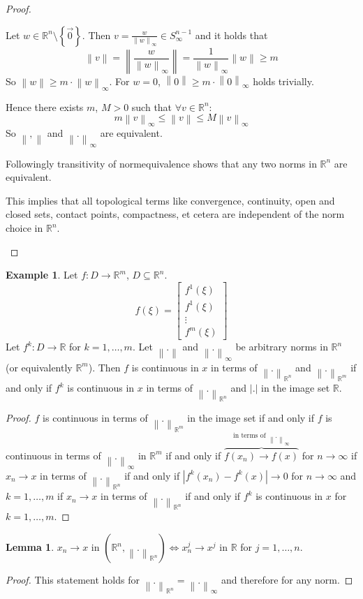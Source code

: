\documentclass[a4paper,landscape,twocolumn]{article}
\theoremstyle{definition}
\newtheorem{ex}{Example}
\newtheorem{lemma}{Lemma}
\newcommand\set[1]{\left\{#1\right\}}
\newcommand\abs[1]{\left|#1\right|}
\newcommand\norm[1]{\left\|#1\right\|}
\newcommand\inorm[1]{\left\|#1\right\|_\infty}
\begin{document}
\begin{proof}
\begin{enumerate}
  Let $w \in \mathbb R^n \setminus \set{\vec{0}}$.
  Then $v = \frac{w}{\inorm{w}} \in S_{\infty}^{n-1}$ and it holds that
  \[ \norm{v} = \norm{\frac{w}{\inorm{w}}} = \frac{1}{\inorm{w}} \norm{w} \geq m \]
  So $\norm{w} \geq m \cdot \inorm{w}$.
  For $w = 0$, $\norm{0} \geq m \cdot \inorm{0}$ holds trivially.

  Hence there exists $m$, $M > 0$ such that $\forall v \in \mathbb R^n$:
  \[ m \inorm{v} \leq \norm{v} \leq M \inorm{v} \]
  So $\norm{,}$ and $\inorm{.}$ are equivalent.

  Followingly transitivity of normequivalence shows that
  any two norms in $\mathbb R^n$ are equivalent.

  This implies that all topological terms like convergence, continuity,
  open and closed sets, contact points, compactness, et cetera are
  independent of the norm choice in $\mathbb R^n$.
\end{enumerate}
\end{proof}

\begin{ex}
  Let $f: D \to \mathbb R^m$, $D \subseteq \mathbb R^n$.
  \[
  f(\xi) = \begin{bmatrix}
    f^1(\xi) \\
    f^1(\xi) \\
    \vdots \\
    f^m(\xi)
    \end{bmatrix}
  \]
  Let $f^k: D \to \mathbb R$ for $k=1,\ldots,m$.
  Let $\norm{.}$ and $\inorm{.}$ be arbitrary norms in $\mathbb R^n$ (or equivalently $\mathbb R^m$).
  Then $f$ is continuous in $x$ in terms of $\norm{.}_{\mathbb R^n}$ and $\norm{.}_{\mathbb R^m}$
  if and only if $f^k$ is continuous in $x$ in terms of $\norm{.}_{\mathbb R^n}$ and $\abs{.}$ in the
  image set $\mathbb R$.
\end{ex}
\begin{proof}
  $f$ is continuous in terms of $\norm{.}_{\mathbb R^m}$ in the image set if and only if
  $f$ is continuous in terms of $\inorm{.}$ in $\mathbb R^m$ if and only if
  $\overbrace{f(x_n) \to f(x)}^{\text{in terms of } \inorm{.}}$ for $n\to\infty$ if $x_n \to x$ in terms of $\norm{.}_{\mathbb R^n}$ if and only if
  $\abs{f^k(x_n) - f^k(x)} \to 0$ for $n \to \infty$ and $k=1,\ldots,m$ if $x_n \to x$ in terms of $\norm{.}_{\mathbb R^n}$ if and only if
  $f^k$ is continuous in $x$ for $k = 1, \ldots, m$.
\end{proof}

\begin{lemma}
  $x_n \to x$ in $(\mathbb R^n, \norm{.}_{\mathbb R^n}) {\iff} x_n^j \to x^j$ in $\mathbb R$ for $j = 1, \ldots, n$.
\end{lemma}
\begin{proof}
  This statement holds for $\norm{.}_{\mathbb R^n} = \inorm{.}$ and therefore for any norm.
\end{proof}
\end{document}
